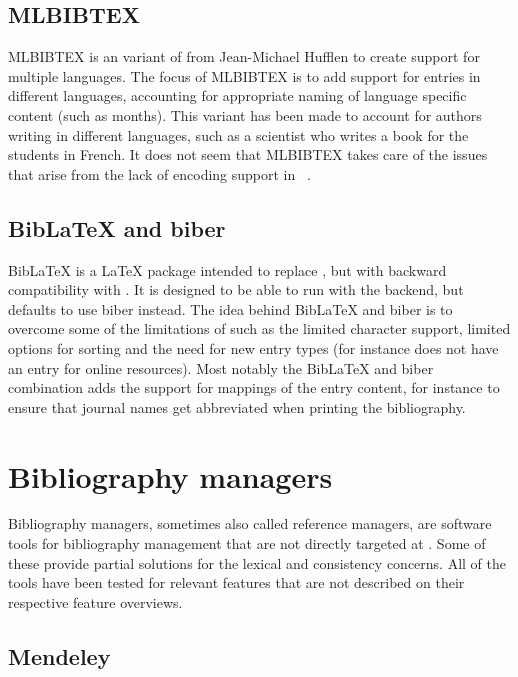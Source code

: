 \subsection{MLBIBTEX}
MLBIBTEX is an variant of {\bibtex} from Jean-Michael Hufflen to
create support for multiple languages.  The focus of MLBIBTEX is to
add support for entries in different languages, accounting for
appropriate naming of language specific content (such as months).
This variant has been made to account for authors writing in different
languages, such as a scientist who writes a book for the students in
French.  It does not seem that MLBIBTEX takes care of the issues that
arise from the lack of encoding support in
{\bibtex}~\cite{hufflen2001_mlbibtex}.


\subsection{Bib{\LaTeX} and biber}
\label{sec:related_biblatex}

Bib{\LaTeX} is a {\LaTeX} package intended to replace {\bibtex}, but
with backward compatibility with {\bibtex}.  It is designed to be able
to run with the {\bibtex} backend, but defaults to use biber instead.
The idea behind Bib{\LaTeX} and biber is to overcome some of the
limitations of {\bibtex} such as the limited character support,
limited options for sorting and the need for new entry types (for
instance {\bibtex} does not have an entry for online resources).  Most
notably the Bib{\LaTeX} and biber combination adds the support for
mappings of the entry content, for instance to ensure that journal
names get abbreviated when printing the bibliography.


\section{Bibliography managers}
\label{sec:bibliography_managers}

Bibliography managers, sometimes also called reference managers, are
software tools for bibliography management that are not directly
targeted at {\bibtex}.  Some of these provide partial solutions for
the lexical and consistency concerns.  All of the tools have been
tested for relevant features that are not described on their
respective feature overviews.

\subsection{Mendeley}
\label{sec:related_mendeley}

